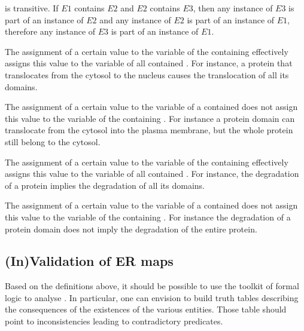 \noindent
{} is transitive. If $E1$ contains $E2$ and $E2$ contains $E3$, then any instance of $E3$ is part of an instance of $E2$ and any instance of $E2$ is part of an instance of $E1$, therefore any instance of $E3$ is part of an instance of $E1$.

\noindent
The assignment of a certain value to the variable  of the containing  effectively assigns this value to the variable  of all contained . For instance, a protein that translocates from the cytosol to the nucleus causes the translocation of all its domains.

\noindent
The assignment of a certain value to the variable  of a contained  does not assign this value to the variable  of the containing . For instance a protein domain can translocate from the cytosol into the plasma membrane, but the whole protein still belong to the cytosol. 

\noindent
The assignment of a certain value to the variable  of the containing  effectively assigns this value to the variable  of all contained . For instance, the degradation of a protein implies the degradation of all its domains.

\noindent
The assignment of a certain value to the variable  of a contained  does not assign this value to the variable  of the containing . For instance the degradation of a protein domain does not imply the degradation of the entire protein.

\subsection{(In)Validation of ER maps}

Based on the definitions above, it should be possible to use the toolkit of formal logic to analyse \ERs{}. In particular, one can envision to build truth tables describing the consequences of the existences of the various entities. Those table should point to inconsistencies leading to contradictory predicates.



